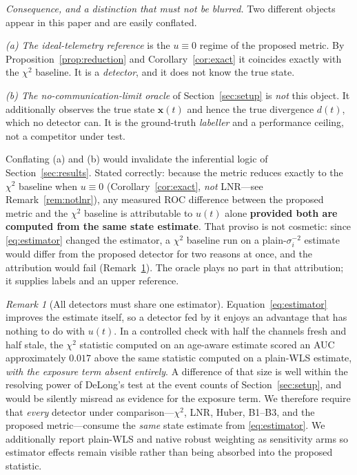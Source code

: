 \documentclass[journal]{IEEEtran}
\theoremstyle{plain}
\theoremstyle{definition}
\theoremstyle{remark}
\newtheorem{remark}{Remark}
\newcommand{\bx}{\mathbf{x}}
\begin{document}
\emph{Consequence, and a distinction that must not be blurred.} Two
different objects appear in this paper and are easily conflated.

\emph{(a) The ideal-telemetry reference} is the $u\equiv0$ regime of the
proposed metric. By Proposition~\ref{prop:reduction} and
Corollary~\ref{cor:exact} it coincides exactly with the $\chi^{2}$ baseline. It
is a \emph{detector}, and it does not know the true state.

\emph{(b) The no-communication-limit oracle} of Section~\ref{sec:setup} is
\emph{not} this object. It additionally observes the true state $\bx(t)$
and hence the true divergence $d(t)$, which no detector can. It is the
ground-truth \emph{labeller} and a performance ceiling, not a competitor
under test.

Conflating (a) and (b) would invalidate the inferential logic of
Section~\ref{sec:results}. Stated correctly: because the metric reduces
exactly to the \emph{$\chi^{2}$} baseline when $u\equiv0$
(Corollary~\ref{cor:exact}, \emph{not} LNR---see
Remark~\ref{rem:notlnr}), any measured ROC difference between the
proposed metric and the $\chi^{2}$ baseline is attributable to $u(t)$
alone \textbf{provided both are computed from the same state estimate}.
That proviso is not cosmetic: since \eqref{eq:estimator} changed the
estimator, a $\chi^{2}$ baseline run on a plain-$\sigma_i^{-2}$ estimate
would differ from the proposed detector for two reasons at once, and the
attribution would fail (Remark~\ref{rem:estmatched}). The oracle plays no
part in that attribution; it supplies labels and an upper reference.

\begin{remark}[All detectors must share one estimator]
\label{rem:estmatched}
Equation~\eqref{eq:estimator} improves the estimate itself, so a detector
fed by it enjoys an advantage that has nothing to do with $u(t)$. In a
controlled check with half the channels fresh and half stale, the
$\chi^{2}$ statistic computed on an age-aware estimate scored an AUC
approximately $0.017$ above the same statistic computed on a plain-WLS
estimate, \emph{with the exposure term absent entirely}. A difference of
that size is well within the resolving power of DeLong's test at the event
counts of Section~\ref{sec:setup}, and would be silently misread as
evidence for the exposure term. We therefore require that \emph{every}
detector under comparison---$\chi^{2}$, LNR, Huber, B1--B3, and the
proposed metric---consume the \emph{same} state estimate from
\eqref{eq:estimator}. We additionally report plain-WLS and native robust
weighting as sensitivity arms so estimator effects remain visible rather
than being absorbed into the proposed statistic.
\end{remark}
\end{document}
